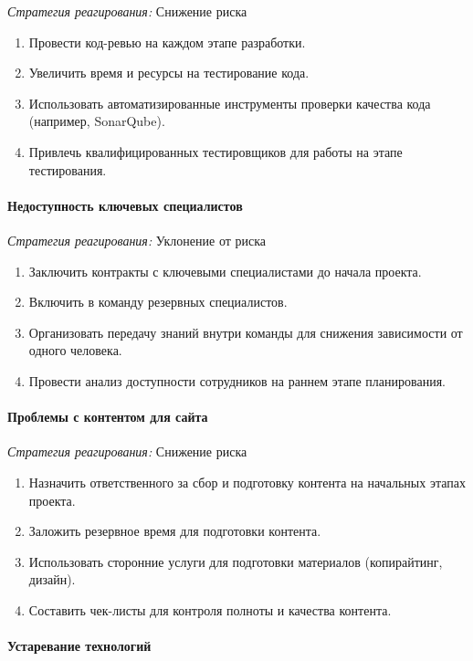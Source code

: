 \textit{Стратегия реагирования:} Снижение риска

\begin{enumerate}
	\item Провести код-ревью на каждом этапе разработки.
	\item Увеличить время и ресурсы на тестирование кода.
	\item Использовать автоматизированные инструменты проверки качества кода (например, SonarQube).
	\item Привлечь квалифицированных тестировщиков для работы на этапе тестирования.
\end{enumerate}

\paragraph{Недоступность ключевых специалистов}

\textit{Стратегия реагирования:} Уклонение от риска

\begin{enumerate}
	\item Заключить контракты с ключевыми специалистами до начала проекта.
	\item Включить в команду резервных специалистов.
	\item Организовать передачу знаний внутри команды для снижения зависимости от одного человека.
	\item Провести анализ доступности сотрудников на раннем этапе планирования.
\end{enumerate}

\paragraph{Проблемы с контентом для сайта}

\textit{Стратегия реагирования:} Снижение риска

\begin{enumerate}
	\item Назначить ответственного за сбор и подготовку контента на начальных этапах проекта.
	\item Заложить резервное время для подготовки контента.
	\item Использовать сторонние услуги для подготовки материалов (копирайтинг, дизайн).
	\item Составить чек-листы для контроля полноты и качества контента.
\end{enumerate}

\paragraph{Устаревание технологий}

